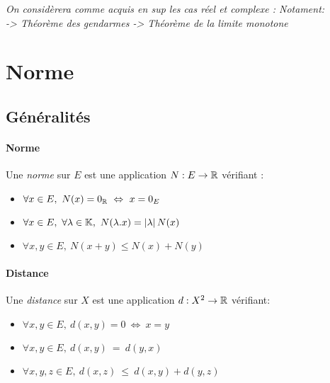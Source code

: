

\textit{\small On considèrera comme acquis en sup les cas réel et complexe : Notament:\\ -> Théorème des gendarmes \hfill -> Théorème de la limite monotone} \hfill ${}$

\minitoc

\section{Norme}

	\subsection{Généralités}
	
		\vspace{-15pt}
		\traitd
		\paragraph{Norme} Une \emph{norme} sur $E$ est une application $N: E \rightarrow{\mathbb{R}}$ vérifiant : 
			\begin{itemize}
				\item $\forall x\in E, ~N(x) = 0_{{\mathbb{R}}} ~\Leftrightarrow ~x=0_E$
				\item $\forall x\in E, ~\forall \lambda \in {\mathbb{K}} , ~N(\lambda .x) = \left\vert \lambda \right\vert N(x)$
				\item $ \forall x,y \in E, ~N(x+y) \leq N(x)+N(y)$ 
			\end{itemize}
		\trait 
		
			
		\traitd
		\paragraph{Distance} Une \emph{distance} sur $X$ est une application $d:X^2\rightarrow{\mathbb{R}}$ vérifiant:
			\begin{itemize}
				\item $\forall x,y\in E, ~d(x,y) = 0 ~\Leftrightarrow ~x=y$
				\item $\forall x,y\in E, ~d(x,y)~=~d(y,x)$
				\item $\forall x,y,z\in E, ~d(x,z)~\leq~d(x,y)+d(y,z)$
			\end{itemize}
		\trait
		
